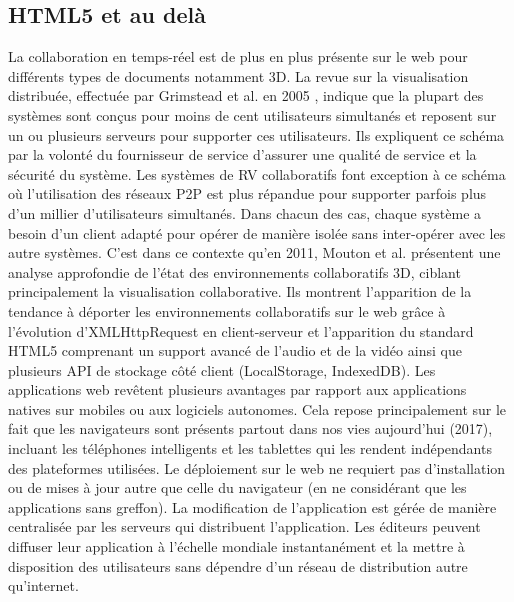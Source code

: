 \subsection{HTML5 et au delà}

La collaboration en temps-réel est de plus en plus présente sur le web pour 
différents types de documents notamment 3D.
La revue sur la visualisation distribuée, effectuée par Grimstead et al. en 2005 
\cite{Grimstead2005}, indique que la plupart des systèmes sont conçus pour 
moins de cent 
utilisateurs simultanés et reposent sur un ou plusieurs serveurs pour supporter ces 
utilisateurs. 
Ils expliquent ce schéma par la volonté du fournisseur de service d'assurer une 
qualité de service et la sécurité du système. 
Les systèmes de \gls{RV} collaboratifs font exception à ce schéma où l'utilisation 
des réseaux \gls{P2P} est plus répandue pour supporter parfois plus d'un millier 
d'utilisateurs simultanés. 
Dans chacun des cas, chaque système a besoin d'un client adapté pour opérer de 
manière isolée sans inter-opérer avec les autre systèmes. 
C'est dans ce contexte qu'en 2011, Mouton et al. \cite{Mouton2011} présentent 
une analyse approfondie de l'état des environnements collaboratifs 3D, ciblant 
principalement la visualisation collaborative. 
Ils montrent l'apparition de la tendance à déporter les environnements collaboratifs 
sur le web grâce à l'évolution d'XMLHttpRequest en client-serveur et l'apparition du 
standard HTML5 comprenant un support avancé de l'audio et de la vidéo ainsi que 
plusieurs \gls{API} de stockage côté client (LocalStorage, IndexedDB). 
Les applications web revêtent plusieurs avantages par rapport aux applications 
natives sur mobiles ou aux logiciels autonomes. 
Cela repose principalement sur le fait que les navigateurs sont présents partout 
dans nos vies aujourd'hui (2017), incluant les téléphones intelligents et les 
tablettes qui les rendent indépendants des plateformes utilisées. 
Le déploiement sur le web ne requiert pas d'installation ou de mises à jour autre 
que celle du navigateur (en ne considérant que les applications sans greffon). 
La modification de l'application est gérée de manière centralisée par les serveurs 
qui distribuent l'application. 
Les éditeurs peuvent diffuser leur application à l'échelle mondiale instantanément  
et la mettre à disposition des utilisateurs sans dépendre d'un réseau de distribution 
autre qu'internet.



